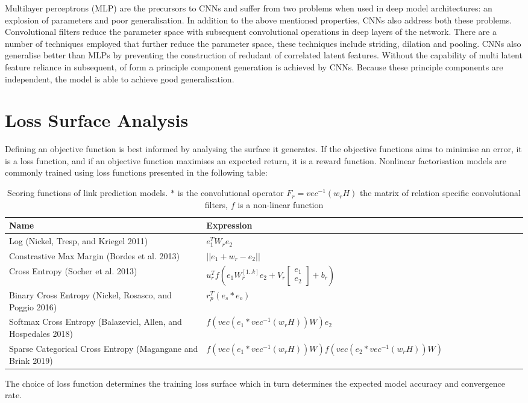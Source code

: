 \newline
Multilayer perceptrons (MLP) are the precursors to CNNs and suffer from two problems when used in deep model architectures: an explosion of parameters and poor generalisation. In addition to the above mentioned properties, CNNs also address both these problems. Convolutional filters reduce the parameter space with subsequent convolutional operations in deep layers of the network. There are a number of techniques employed that further reduce the parameter space, these techniques include striding, dilation and pooling. CNNs also generalise better than MLPs by preventing the construction of redudant of correlated latent features. Without the capability of multi latent feature reliance in subsequent, of form a principle component generation is achieved by CNNs. Because these principle components are independent, the model is able to achieve good generalisation. 




\section{Loss Surface Analysis}
Defining an objective function is best informed by analysing the surface it generates. If the objective functions aims to minimise an error, it is a loss function, and if an objective function maximises an expected return, it is a reward function. Nonlinear factorisation models are commonly trained using loss functions presented in the following table:
\begin{table}[H]
\centering
\begin{tabular}{lllllllllll}
  \textbf{Name} & \textbf{Expression} \\
  \hline
  Log (Nickel, Tresp, and Kriegel 2011) & $e^T_1W_r e_2$  \\
  Constrastive Max Margin (Bordes et al. 2013) & $|| e_1 + w_r - e_2 ||$ \\
  Cross Entropy (Socher et al. 2013) & $u^T_r f(e_1W_r^{[1..k]} e_2 + V_r \begin{bmatrix}e_1 \\ e_2\end{bmatrix} + b_r)$ \\
  Binary Cross Entropy (Nickel, Rosasco, and Poggio 2016) & $r^T_p(e_s * e_o)$ \\
  Softmax Cross Entropy (Balazevicl, Allen, and Hospedales 2018) & $f(vec(e_1 * vec^{-1}(w_rH))W)e_2$ \\
  Sparse Categorical Cross Entropy (Magangane and Brink 2019) & $f(vec(e_1 * vec^{-1}(w_rH))W)f(vec(e_2 * vec^{-1}(w_rH))W)$
\end{tabular}
 \caption {Scoring functions of link prediction models. $*$ is the convolutional operator $F_r = vec^{-1}(w_rH)$ the matrix of relation specific convolutional filters, $f$ is a non-linear function}
\end{table} 
The choice of loss function determines the training loss surface which in turn determines the expected model accuracy and convergence rate.

